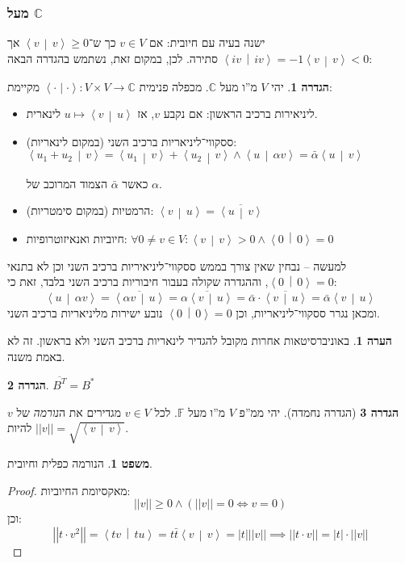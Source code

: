 \documentclass[a4paper]{article}
\newcommand\C     {\mathbb{C}}
\newcommand\ra    {\rangle}
\newcommand\la    {\langle}
\newcommand\ol    {\overline}
\newcommand\F         {\mathbb{F}}
\newcommand\co        {\colon}
\newcommand\norm[1]   {\left \vert \left \vert #1 \right \vert \right \vert}
\newcommand\smut      {\left \la \cdot \mid \cdot \right \ra}
\newcommand\mut [2]   {\left \la #1 \,\middle\vert\, #2 \right \ra}
\newcommand\ag        {\alpha}
\newcommand\sof[1]    {\left | #1 \right |}
\theoremstyle{definition}
\newtheorem{Theorem}{\color{myblue}משפט}
\newtheorem{Definition}{\color{mygreen}הגדרה}
\newtheorem{Remark}{\color{mycyan}הערה}
\newcommand\theo  [1] {\begin{Theorem}#1\end{Theorem}}
\newcommand\defi  [1] {\begin{Definition}#1\end{Definition}}
\newcommand\rmark [1] {\begin{Remark}#1\end{Remark}}
\begin{document}
	\subsubsection{מעל $\C$}
	ישנה בעיה עם חיובית: אם $v \in V$ כך ש־$\mut{v}{v} \ge 0$ אך $\mut{iv}{iv} = -1\mut{v}{v} < 0$ סתירה. לכן, במקום זאת, נשתמש בהגדרה הבאה: 
	\defi{יהי $V$ מ''ו מעל $\C$. מכפלה פנימית $\smut \co V \times V \to \C$ מקיימת: 
		\begin{itemize}
			\item ליניאירות ברכיב הראשון: אם נקבע $v$, אז $u \mapsto \mut{v}{u}$ לינארית. 
			\item ססקווי־ליניאריות ברכיב השני (במקום לינאריות): \hfill $\mut{u_1 + u_2}{v} = \mut{u_1}{v} + \mut{u_2}{v} \land \mut{u}{\ag v} = \bar \ag \mut{u}{v}$ 
			
			כאשר $\bar \ag$ הצמוד המרוכב של $\ag$. 
			\item הרמטיות (במקום סימטריות): \hfill $\mut{v}{u} = \ol{\mut{u}{v}}$
			\item חיוביות ואנאיזוטרופיות: \hfill $\forall 0 \neq v \in V \co \mut{v}{v} > 0 \land \mut{0}{0} = 0$
	\end{itemize}}
	למעשה – נבחין שאין צורך בממש ססקווי־ליניאיריות ברכיב השני וכן לא בתנאי $\mut{0}{0} = 0$, וההגדרה שקולה בעבור חיבוריות ברכיב השני בלבד, זאת כי: 
	\[ \mut{u}{\ag v} = \ol{\mut{\ag v}{u}} = \ol{\ag \mut{v}{u}} = \bar \ag \cdot \ol{\mut{v}{u}} = \bar \ag \mut{v}{u} \]
	ומכאן נגרר ססקווי־ליניאריות, וכן $\mut{0}{0} = 0$ נובע ישירות מליניאריות ברכיב השני. 
	
	\rmark{באוניברסיטאות אחרות מקובל להגדיר לינאריות ברכיב השני ולא בראשון. זה לא באמת משנה. }
	
	
	\defi{\hfil $\ol{B^T} = B^*$}
	
	\begin{Definition}[הגדרה נחמדה]
		יהי ממ''פ $V$ מ''ו מעל $\F$. לכל $v \in V$ מגדירים את ה\textit{נורמה} של $v$ להיות $ \norm{v} = \sqrt{\mut{v}{v}} $. 
	\end{Definition}
	
	\theo{הנורמה כפלית וחיובית. }
	\begin{proof}
		מאקסיומת החיוביות: 
		\[ \norm{v} \ge 0 \land (\norm{v} = 0 \iff v = 0) \]
		וכן: 
		\[ \norm{t \cdot v^2} = \mut{tv}{tu} = t \bar t\mut{v}{v} = \sof{t}\norm{v} \implies \norm{t \cdot v} = \sof{t} \cdot \norm{v} \]
	\end{proof}
	
\end{document}
